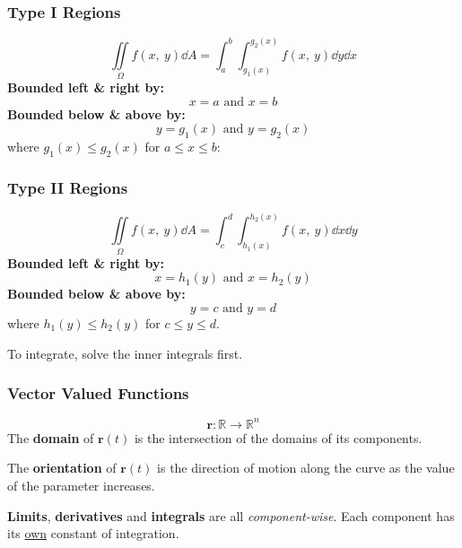 \documentclass{article}
\begin{document}
\begin{multicols}{3}
    \subsubsection*{Type I Regions}
    \begin{equation*}
        \iint\limits_{\Omega} f(x,\: y) \dd{A} = \int_a^b\int_{g_1(x)}^{g_2(x)} f(x,\: y) \dd{y} \dd{x}
    \end{equation*}
    \textbf{Bounded left \& right by:}
    \begin{equation*}
        x=a \text{ and } x=b
    \end{equation*}
    \textbf{Bounded below \& above by:}
    \begin{equation*}
        y=g_1(x) \text{ and } y=g_2(x)
    \end{equation*}
    where $g_1(x) \leq g_2(x)$ for $a \leq x \leq b$:
    \subsubsection*{Type II Regions}
    \begin{equation*}
        \iint\limits_{\Omega} f(x,\: y) \dd{A} = \int_c^d\int_{h_1(x)}^{h_2(x)} f(x,\: y) \dd{x} \dd{y}
    \end{equation*}
    \textbf{Bounded left \& right by:}
    \begin{equation*}
        x=h_1(y) \text{ and } x=h_2(y)
    \end{equation*}
    \textbf{Bounded below \& above by:}
    \begin{equation*}
        y=c \text{ and } y=d
    \end{equation*}
    where $h_1(y) \leq h_2(y)$ for $c \leq y \leq d$.

    To integrate, solve the inner integrals first.
    \subsubsection*{Vector Valued Functions}
    \begin{equation*}
        \symbf{r}:\mathbb{R} \to \mathbb{R}^n
    \end{equation*}
    The \textbf{domain} of $\symbf{r}(t)$ is the intersection of the domains
    of its components.

    The \textbf{orientation} of $\symbf{r}(t)$ is the direction of motion along the
    curve as the value of the parameter increases.

    \textbf{Limits}, \textbf{derivatives} and \textbf{integrals} are all \textit{component-wise}. Each component has its \underline{own} constant of integration.

\end{multicols}
\end{document}
